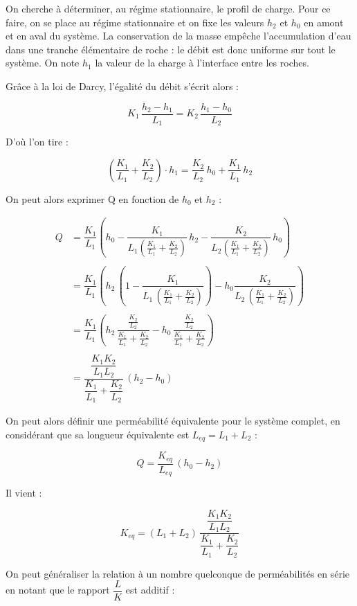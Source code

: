 \documentclass{article}
\begin{document}
On cherche à déterminer, au régime stationnaire, le profil de charge. Pour ce faire, on se place au régime stationnaire et on fixe les valeurs $h_2$ et $h_0$ en amont et en aval du système. La conservation de la masse empêche l’accumulation d’eau dans une tranche élémentaire de roche : le débit est donc uniforme sur tout le système. On note $h_1$ la valeur de la charge à l’interface entre les roches.

Grâce à la loi de Darcy,  l’égalité du débit s’écrit alors : 

$$ K_1 \,\frac{h_2 - h_1}{L_1} = K_2\, \frac{h_1 - h_0}{L_2} $$

D’où l’on tire :

$$ \left(\frac{K_1}{L_1} + \frac{K_2}{L_2}\right)\cdot h_1 = \frac{K_2}{L_2} \,h_0 + \frac{K_1}{L_1}\, h_2$$

On peut alors exprimer Q en fonction de $h_0$ et $h_2$ :

\begin{equation}
\begin{split}
Q &= \dfrac{K_1}{L_1} \left(h_0 - \dfrac{K_1}{L_1(\frac{K_1}{L_1} + \frac{K_2}{L_2})}\,h_2 - \dfrac{K_2}{L_2(\frac{K_1}{L_1} + \frac{K_2}{L_2})}\,h_0\right)\\
&\\
& = \dfrac{K_1}{L_1}\left(h_2\,\left(1 -  \dfrac{K_1}{L_1\,(\frac{K_1}{L_1} + \frac{K_2}{L_2})}\right) - h_0\dfrac{K_2}{L_2\,(\frac{K_1}{L_1} + \frac{K_2}{L_2})}\right)\\ 
&\\
& = \dfrac{K_1}{L_1}\left(h_2\,\dfrac{\frac{K_2}{L_2}}{\frac{K_1}{L_1} + \frac{K_2}{L_2}} - h_0\,\dfrac{\frac{K_2}{L_2}}{\frac{K_1}{L_1} + \frac{K_2}{L_2}}\right)\\
&\\
& = \dfrac{\dfrac{K_1K_2}{L_1L_2}}{\dfrac{K_1}{L_1} + \dfrac{K_2}{L_2}}\,(h_2 - h_0)
\end{split}
\end{equation}


On peut alors définir une perméabilité équivalente pour le système complet, en considérant que sa longueur équivalente est $L_{eq} = L_1 + L_2$ :

$$ Q = \frac{K_{eq}}{L_{eq}}\,(h_0 - h_2) $$

Il vient :

$$ K_{eq} = (L_1 + L_2)\,\dfrac{\dfrac{K_1K_2}{L_1L_2}}{\dfrac{K_1}{L_1} + \dfrac{K_2}{L_2}} $$

On peut généraliser la relation à un nombre quelconque de perméabilités en série en notant que le rapport $ \dfrac{L}{K} $ est additif :  
\end{document}
